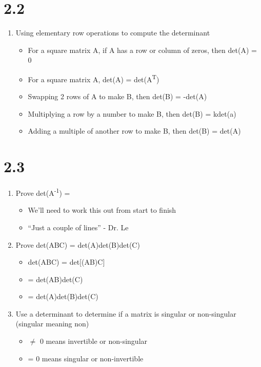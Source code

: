 \documentclass[letterpaper, 12pt]{article}
\begin{document}
\section{2.2}
\label{sec:orgf0f3fea}
\begin{enumerate}
\item Using elementary row operations to compute the determinant\\
\begin{itemize}
\item For a square matrix A, if A has a row or column of zeros, then det(A) = 0\\
\item For a square matrix A, det(A) = det(A\textsuperscript{T})\\
\item Swapping 2 rows of A to make B, then det(B) = -det(A)\\
\item Multiplying a row by a number to make B, then det(B) = kdet(a)\\
\item Adding a multiple of another row to make B, then det(B) = det(A)\\
\end{itemize}
\end{enumerate}
\section{2.3}
\label{sec:org3e39d71}
\begin{enumerate}
\item Prove det(A\textsuperscript{-1}) = \\
\begin{itemize}
\item We'll need to work this out from start to finish\\
\item ``Just a couple of lines'' - Dr. Le\\
\end{itemize}
\item Prove det(ABC) = det(A)det(B)det(C)\\
\begin{itemize}
\item det(ABC) = det[(AB)C]\\
\item = det(AB)det(C)\\
\item = det(A)det(B)det(C)\\
\end{itemize}
\item Use a determinant to determine if a matrix is singular or non-singular (singular meaning non)\\
\begin{itemize}
\item \(\neq\) 0 means invertible or non-singular\\
\item = 0 means singular or non-invertible\\
\end{itemize}
\end{enumerate}
\end{document}
